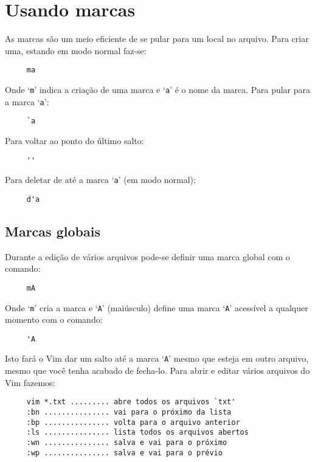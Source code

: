 \section{Usando marcas}
\label{sec:Usando marcas}

As marcas são um meio eficiente de se pular para um local no arquivo. Para
criar uma,  estando em modo normal faz-se:

\begin{verbatim}
     ma
\end{verbatim}

Onde `{\tt m}' indica a criação de uma marca e `{\tt a}' é o nome da marca.
Para pular para a marca `{\tt a}':

\begin{verbatim}
     `a
\end{verbatim}

Para voltar ao ponto do último salto:

\begin{verbatim}
     ''
\end{verbatim}

Para deletar de até a marca `{\tt a}' (em modo normal):

\begin{verbatim}
     d'a
\end{verbatim}

\subsection{Marcas globais}

Durante a edição de vários arquivos pode-se definir uma marca global com o
comando:

\begin{verbatim}
     mA
\end{verbatim}

Onde `{\tt m}' cria a marca e `{\tt A}' (maiúsculo) define uma marca `{\tt A}'
acessível a qualquer momento com o comando:

\begin{verbatim}
     'A
\end{verbatim}

Isto fará o Vim dar um salto até a marca `{\tt A}' mesmo que esteja em outro arquivo,
mesmo que você tenha acabado de fecha-lo. Para abrir e editar vários arquivos
do Vim fazemos:

\begin{verbatim}
     vim *.txt ......... abre todos os arquivos `txt'
     :bn ............... vai para o próximo da lista
     :bp ............... volta para o arquivo anterior
     :ls ............... lista todos os arquivos abertos
     :wn ............... salva e vai para o próximo
     :wp ............... salva e vai para o prévio
\end{verbatim}


